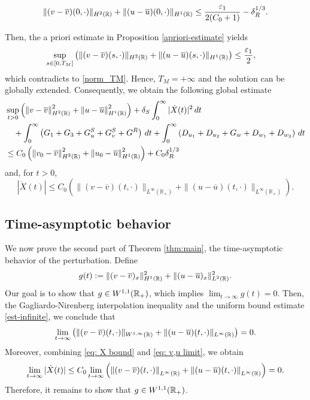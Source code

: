 \documentclass[11pt,reqno]{amsart}
\begin{document}
\begin{align*}
     \| (v-\overline{v})(0,\cdot) \|_{H^2(\mathbb{R})}+\|(u-\overline{u})(0,\cdot) \|_{H^1(\mathbb{R})}
     \le  \frac{\varepsilon_1}{2(C_0+1)} - \delta_R^{1/3}.
 \end{align*}

Then, the a priori estimate in Proposition \ref{apriori-estimate} yields
 \begin{align*}
     \sup_{s\in[0,T_M]} \left( \| (v-\overline{v})(s,\cdot) \|_{H^2(\mathbb{R})}+\|(u-\overline{u})(s,\cdot) \|_{H^1(\mathbb{R})} \right)  &\le  \frac{\varepsilon_1}{2},
 \end{align*}
 which contradicts to \eqref{norm_TM}. Hence, $T_M=+\infty$ and the solution can be globally extended. Consequently, we obtain the following global estimate
	\begin{equation}
	\begin{aligned}\label{est-infinite}
	& \sup_{t>0}\left(\left\lVert v-\overline{v}\right\rVert_{H^2 (\mathbb{R})}^2 +\left\lVert u-\overline{u}\right\rVert_{H^1(\mathbb{R})}^2\right)+\delta_S \int_0^\infty | \dot{X}(t)|^2 \, d t \\ 
	&\quad +\int_0^\infty \left( G_1+G_3+G^S_u+G^S_v+G^R \right)  \, dt+  \int_0^\infty \left( D_{u_1} + D_{u_2} + G_{w} + D_{w_1} + D_{w_2} \right)\, dt  \\ 
	& \le C_0 \left(\left\lVert v_0-\overline{v}\right\rVert_{H^2 (\mathbb{R})}^2 +\left\lVert u_0-\overline{u}\right\rVert_{H^1(\mathbb{R})}^2\right) + C_0 \delta_R^{1/3}
	\end{aligned}
	\end{equation}
	and, for $t>0$,
	\begin{equation} \label{eq: X bound}
	|\dot{X}(t)|\le C_0 \left(\|(v-\overline{v})(t,\cdot)\|_{L^\infty(\mathbb{R}_+)}+\|(u-\overline{u})(t,\cdot)\|_{L^\infty(\mathbb{R}_+)}\right).
	\end{equation}
	
	
	\subsection{Time-asymptotic behavior} \label{Time-asymptotic behavior}
	We now prove the second part of Theorem \ref{thm:main}, the time-asymptotic behavior of the perturbation. Define
	\[g(t):=\|(v-\overline{v})_x\|_{H^1(\mathbb{R})}^2+\|(u-\overline{u})_x\|_{L^2(\mathbb{R})}^2.\]
	Our goal is to show that $g\in W^{1,1}(\mathbb{R}_+)$, which implies $\lim_{t\to\infty}g(t)=0$. Then, the Gagliardo-Nirenberg interpolation inequality and the uniform bound estimate \eqref{est-infinite}, we conclude that 
	\begin{equation} \label{eq: v,u limit}
	\lim_{t\to\infty}\left(\|(v-\overline{v})(t,\cdot)\|_{W^{1,\infty}(\mathbb{R})}+\|(u-\overline{u})(t,\cdot)\|_{L^\infty(\mathbb{R})}\right)=0.
	\end{equation}
	Moreover, combining  \eqref{eq: X bound} and \eqref{eq: v,u limit}, we obtain
	\[ \lim_{t \to \infty} |\dot{X}(t)| \le C_0 \lim_{t \to \infty} \left( \left\lVert(v-\overline{v})(t,\cdot)\right\rVert_{L^\infty(\mathbb{R})} + \left\lVert(u-\overline{u})(t,\cdot)\right\rVert_{L^\infty(\mathbb{R})} \right)=0.\]
	Therefore, it remains to show that $g\in W^{1,1}(\mathbb{R}_+)$.\\
	
\end{document}
